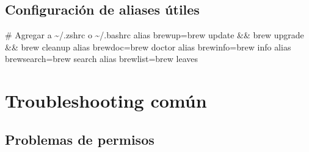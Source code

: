 \documentclass[
  11pt,
  letterpaper,
  oneside,
  openany]{scrbook}
\newenvironment{Shaded}{}{}
\newcommand{\AttributeTok}[1]{\textcolor[rgb]{0.84,0.23,0.29}{#1}}
\newcommand{\BuiltInTok}[1]{\textcolor[rgb]{0.84,0.23,0.29}{#1}}
\newcommand{\CommentTok}[1]{\textcolor[rgb]{0.42,0.45,0.49}{#1}}
\newcommand{\ExtensionTok}[1]{\textcolor[rgb]{0.84,0.23,0.29}{\textbf{#1}}}
\newcommand{\FunctionTok}[1]{\textcolor[rgb]{0.44,0.26,0.76}{#1}}
\newcommand{\NormalTok}[1]{\textcolor[rgb]{0.14,0.16,0.18}{#1}}
\newcommand{\PreprocessorTok}[1]{\textcolor[rgb]{0.84,0.23,0.29}{#1}}
\newcommand{\StringTok}[1]{\textcolor[rgb]{0.01,0.18,0.38}{#1}}
\newcommand{\VariableTok}[1]{\textcolor[rgb]{0.89,0.38,0.04}{#1}}
\begin{document}
\subsection{Configuración de aliases
útiles}\label{configuraciuxf3n-de-aliases-uxfatiles}

\begin{Shaded}
\begin{Highlighting}[]
\CommentTok{\# Agregar a \textasciitilde{}/.zshrc o \textasciitilde{}/.bashrc}
\BuiltInTok{alias}\NormalTok{ brewup=}\StringTok{\textquotesingle{}brew update \&\& brew upgrade \&\& brew cleanup\textquotesingle{}}
\BuiltInTok{alias}\NormalTok{ brewdoc=}\StringTok{\textquotesingle{}brew doctor\textquotesingle{}}
\BuiltInTok{alias}\NormalTok{ brewinfo=}\StringTok{\textquotesingle{}brew info\textquotesingle{}}
\BuiltInTok{alias}\NormalTok{ brewsearch=}\StringTok{\textquotesingle{}brew search\textquotesingle{}}
\BuiltInTok{alias}\NormalTok{ brewlist=}\StringTok{\textquotesingle{}brew leaves\textquotesingle{}}
\end{Highlighting}
\end{Shaded}

\section{Troubleshooting común}\label{troubleshooting-comuxfan}

\subsection{Problemas de permisos}\label{problemas-de-permisos}

\begin{Shaded}
\end{Shaded}
\end{document}
